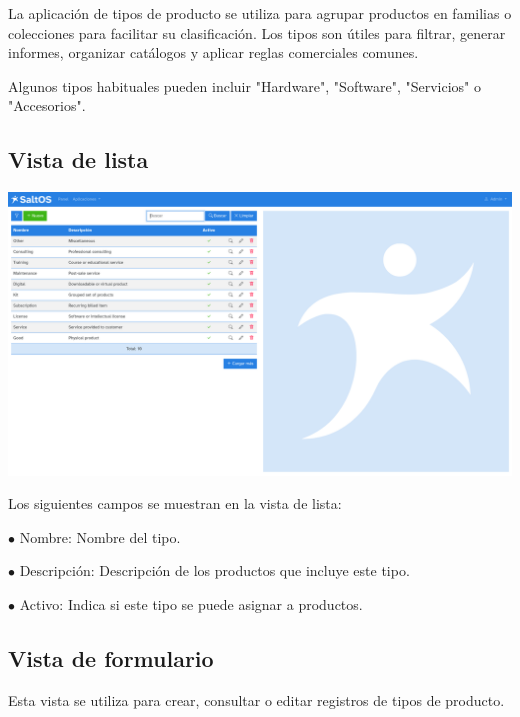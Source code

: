 \documentclass[a4paper]{article}
\begin{document}
La aplicación de tipos de producto se utiliza para agrupar productos en familias o colecciones para facilitar su clasificación.
Los tipos son útiles para filtrar, generar informes, organizar catálogos y aplicar reglas comerciales comunes.

Algunos tipos habituales pueden incluir "Hardware", "Software", "Servicios" o "Accesorios".

\hypertarget{toc163}{}
\subsection{Vista de lista}

\begin{center}\includegraphics[width=1\textwidth]{../ujest/snaps/test-screenshots-js-screenshots-sales-products-types-list-es-es-1-snap.png}\end{center}

Los siguientes campos se muestran en la vista de lista:

\begin{compactitem}
\item[\color{myblue}$\bullet$] Nombre: Nombre del tipo.
\item[\color{myblue}$\bullet$] Descripción: Descripción de los productos que incluye este tipo.
\item[\color{myblue}$\bullet$] Activo: Indica si este tipo se puede asignar a productos.
\end{compactitem}

\hypertarget{toc164}{}
\subsection{Vista de formulario}

Esta vista se utiliza para crear, consultar o editar registros de tipos de producto.
\end{document}
